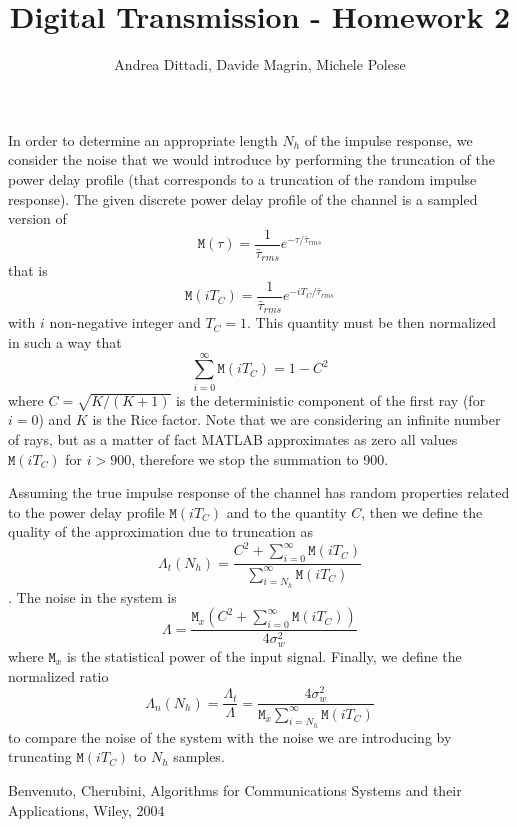 \documentclass[10pt]{article}
\newcommand{\M} {\mathtt{M}}
\numberwithin{equation}{section}
\begin{document}
\title{Digital Transmission - Homework 2}
\author{Andrea Dittadi, Davide Magrin, Michele Polese}

\maketitle


In order to determine an appropriate length $N_h$ of the impulse response, we consider the noise that we would introduce by performing the truncation of the power delay profile (that corresponds to a truncation of the random impulse response). The given discrete power delay profile of the channel is a sampled version of
$$ \M(\tau) = \frac{1}{\bar{\tau}_{rms}} e^{-\tau / \bar{\tau}_{rms}} $$
that is
$$ \M(iT_C) = \frac{1}{\bar{\tau}_{rms}} e^{-iT_C / \bar{\tau}_{rms}} $$
with $i$ non-negative integer and $T_C = 1$. This quantity must be then normalized in such a way that
$$\sum_{i=0}^{\infty} \M(iT_C) = 1 - C^2 $$
where $C = \sqrt{K / (K+1)}$ is the deterministic component of the first ray (for $i=0$) and $K$ is the Rice factor. Note that we are considering an infinite number of rays, but as a matter of fact MATLAB approximates as zero all values $\M(iT_C)$ for $i > 900$, therefore we stop the summation to 900.

Assuming the true impulse response of the channel has random properties related to the power delay profile $\M(iT_C)$ and to the quantity $C$, then we define the quality of the approximation due to truncation as
$$ \Lambda_t(N_h) = \frac{C^2 + \sum_{i=0}^{\infty} \M(iT_C)}{\sum_{i=N_h}^{\infty} \M(iT_C)} $$. The noise in the system is
$$ \Lambda = \frac{\M_x (C^2 + \sum_{i=0}^{\infty} \M(iT_C))}{4 \sigma_w^2} $$
where $\M_x$ is the statistical power of the input signal. Finally, we define the normalized ratio
$$ \Lambda_n (N_h) = \frac{\Lambda_t}{\Lambda} = \frac{4 \sigma_w^2}{\M_x \sum_{i=N_h}^{\infty} \M(iT_C)} $$
to compare the noise of the system with the noise we are introducing by truncating $\M(iT_C)$ to $N_h$ samples.



\begin{thebibliography}{10}

Benvenuto, Cherubini, Algorithms for Communications Systems and their Applications, Wiley, 2004


\end{thebibliography}
\end{document}
